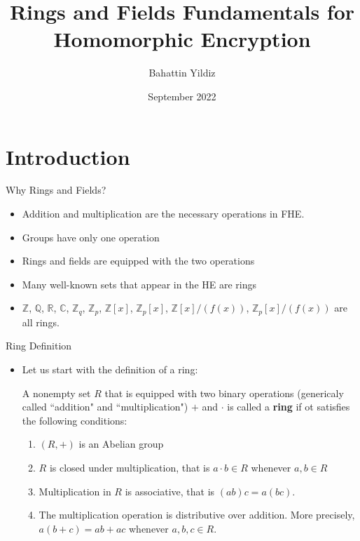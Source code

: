 \documentclass[ %
 10pt, xcolor={dvipsnames,svgnames,x11names,hyperref},
   hyperref={colorlinks=true,citecolor=green,linkcolor=DarkRed,urlcolor=ProcessBlue,anchorcolor=blue}
  ]{beamer}
\newenvironment{stepitemize}{\begin{itemize}[<+->]}{\end{itemize} }
\newcommand{\Z}{\mathbb{Z}}
\newcommand{\Q}{\mathbb{Q}}
\newcommand{\R}{\mathbb{R}}
\newcommand{\C}{\mathbb{C}}
\begin{document}
\title[Rings and Fields Fundamentals]{
Rings and Fields Fundamentals for Homomorphic Encryption}
\author{Bahattin Yildiz}
\date[September]{September 2022}
\maketitle

\section{Introduction}

\begin{frame}{Why Rings and Fields?}
\begin{stepitemize}
    \item Addition and multiplication are the necessary operations in FHE.
    \item Groups have only one operation
    \item Rings and fields are equipped with the two operations
    \item Many well-known sets that appear in the HE are rings
    \item $\Z$, $\Q$, $\R$, $\C$, $\Z_q$, $\Z_p$, $\Z[x]$, $\Z_p[x]$, $\Z[x]/(f(x))$, $\Z_p[x]/(f(x))$ are all rings.
\end{stepitemize}
\end{frame}

\begin{frame}{Ring Definition}
\begin{stepitemize}
\item Let us start with the definition of a ring:
\begin{definition}
A nonempty set $R$ that is equipped with two binary operations (genericaly called ``addition" and ``multiplication") $+$ and $\cdot$ is called a {\bf ring} if ot satisfies the following conditions:
\begin{enumerate}
    \item $(R,+)$ is an Abelian group
 \item $R$ is closed under multiplication, that is $a\cdot b \in R$ whenever $a,b\in R$
 \item Multiplication in $R$ is associative, that is $(ab)c=a(bc)$.
 \item The multiplication operation is distributive over addition. More precisely, $a(b+c)=ab+ac$ whenever $a, b, c \in R$.
\end{enumerate}
\end{definition}
\end{stepitemize}

\end{frame}
\end{document}
